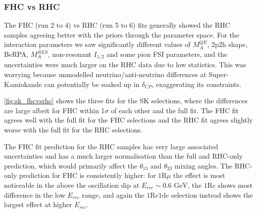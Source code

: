 \subsubsection{FHC vs RHC}
The FHC (run 2 to 4) vs RHC (run 5 to 6) fits generally showed the RHC samples agreeing better with the priors through the parameter space. For the interaction parameters we saw significantly different values of $M_A^{QE}$, 2p2h shape, BeRPA, $M_A^{RES}$, non-resonant $I_{1/2}$ and some pion FSI parameters, and the uncertainties were much larger on the RHC data due to low statistics. This was worrying because unmodelled neutrino/anti-neutrino differences at Super-Kamiokande can potentially be soaked up in $\delta_{CP}$, exaggerating its constraints.

\autoref{fig:sk_fhcvsrhc} shows the three fits for the SK selections, where the differences are large albeit for FHC within 1$\sigma$ of each other and the full fit. The FHC fit agrees well with the full fit for the FHC selections and the RHC fit agrees slightly worse with the full fit for the RHC selections.

The FHC fit prediction for the RHC samples has very large associated uncertainties and has a much larger normalisation than the full and RHC-only prediction, which would primarily affect the $\theta_{13}$ and $\theta_{23}$ mixing angles. The RHC-only prediction for FHC is consistently higher: for $1\text{R}\mu$ the effect is most noticeable in the above the oscillation dip at $E_{rec}\sim0.6\text{ GeV}$, the $1\text{R}e$ shows most difference in the low $E_{rec}$ range, and again the $1\text{R}e1\text{d}e$ selection instead shows the largest effect at higher $E_{rec}$.

